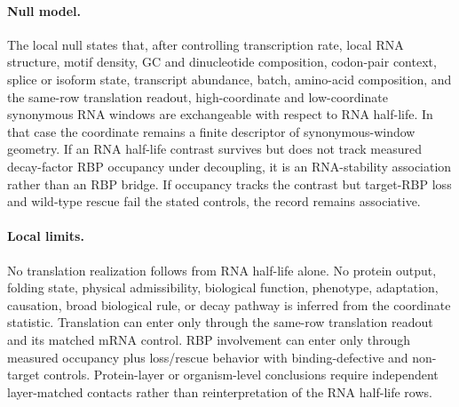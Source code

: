 \paragraph{Null model.}
The local null states that, after controlling transcription rate, local RNA structure, motif density, GC and dinucleotide composition, codon-pair context, splice or isoform state, transcript abundance, batch, amino-acid composition, and the same-row translation readout, high-coordinate and low-coordinate synonymous RNA windows are exchangeable with respect to RNA half-life. In that case the coordinate remains a finite descriptor of synonymous-window geometry. If an RNA half-life contrast survives but does not track measured decay-factor RBP occupancy under decoupling, it is an RNA-stability association rather than an RBP bridge. If occupancy tracks the contrast but target-RBP loss and wild-type rescue fail the stated controls, the record remains associative.

\paragraph{Local limits.}
No translation realization follows from RNA half-life alone. No protein output, folding state, physical admissibility, biological function, phenotype, adaptation, causation, broad biological rule, or decay pathway is inferred from the coordinate statistic. Translation can enter only through the same-row translation readout and its matched mRNA control. RBP involvement can enter only through measured occupancy plus loss/rescue behavior with binding-defective and non-target controls. Protein-layer or organism-level conclusions require independent layer-matched contacts rather than reinterpretation of the RNA half-life rows.
